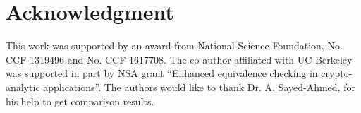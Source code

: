 \documentclass[journal, 10pt]{IEEEtran}
\begin{document}
\vspace{-3mm}
\section*{Acknowledgment}
{\small This work was supported by an award from National Science Foundation, No. CCF-1319496 and No. CCF-1617708. The co-author affiliated with UC Berkeley was supported in part by NSA grant ``Enhanced equivalence checking in
crypto-analytic applications''. The authors would like to thank Dr. A. Sayed-Ahmed, for his help to get comparison results.}


\small


\end{document}
